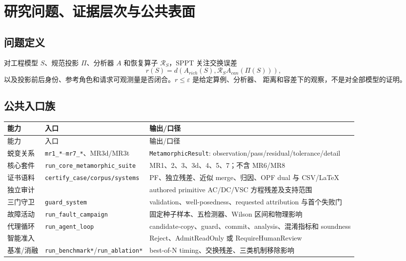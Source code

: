 \section{研究问题、证据层次与公共表面}

\subsection{问题定义}

对工程模型 $S$、规范投影 $\Pi$、分析器 $A$ 和恢复算子 $\mathcal R_S$，SPPT 关注交换误差
\begin{equation}
r(S)=d\!\left(A_{rich}(S),\mathcal R_S A_{can}(\Pi(S))\right),
\end{equation}
以及投影前后身份、参考角色和请求可观测量是否闭合。$r\le\varepsilon$ 是给定算例、分析器、
距离和容差下的观察，不是对全部模型的证明。

\subsection{公共入口族}

\begin{center}\footnotesize
\begin{longtable}{@{}L{3.5cm}L{5.0cm}L{6.7cm}@{}}
\toprule 能力 & 入口 & 输出/口径\\\midrule
\endfirsthead
\toprule 能力 & 入口 & 输出/口径\\\midrule\endhead
蜕变关系 & \texttt{mr1\_*}--\texttt{mr7\_*}、MR3d/MR3t & \texttt{MetamorphicResult}: observation/pass/residual/tolerance/detail\\
核心套件 & \texttt{run\_core\_metamorphic\_suite} & MR1、2、3、3d、4、5、7；不含 MR6/MR8\\
证书语料 & \texttt{certify\_case/corpus/systems} & PF、独立残差、近似 merge、归因、OPF dual 与 CSV/LaTeX\\
独立审计 &  & authored primitive AC/DC/VSC 方程残差及支持范围\\
三门守卫 & \texttt{guard\_system} & validation、well-posedness、requested attribution 与首个失败门\\
故障活动 & \texttt{run\_fault\_campaign} & 固定种子样本、五检测器、Wilson 区间和物理影响\\
代理循环 & \texttt{run\_agent\_loop} & candidate-copy、guard、commit、analysis、混淆指标和 soundness\\
智能准入 &  & Reject、AdmitReadOnly 或 RequireHumanReview\\
基准/消融 & \texttt{run\_benchmark*}/\texttt{run\_ablation*} & best-of-N timing、交换残差、三类机制移除影响\\
\bottomrule
\end{longtable}
\end{center}

